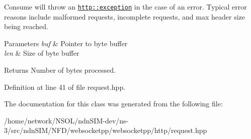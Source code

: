 Consume will throw an \href{http::exception}{\tt http\+::exception} in the case of an error. Typical error reasons include malformed requests, incomplete requests, and max header size being reached.


\begin{DoxyParams}{Parameters}
{\em buf} & Pointer to byte buffer \\
\hline
{\em len} & Size of byte buffer \\
\hline
\end{DoxyParams}
\begin{DoxyReturn}{Returns}
Number of bytes processed. 
\end{DoxyReturn}


Definition at line 41 of file request.\+hpp.



The documentation for this class was generated from the following file\+:\begin{DoxyCompactItemize}
\item 
/home/network/\+N\+S\+O\+L/ndn\+S\+I\+M-\/dev/ns-\/3/src/ndn\+S\+I\+M/\+N\+F\+D/websocketpp/websocketpp/http/request.\+hpp\end{DoxyCompactItemize}
